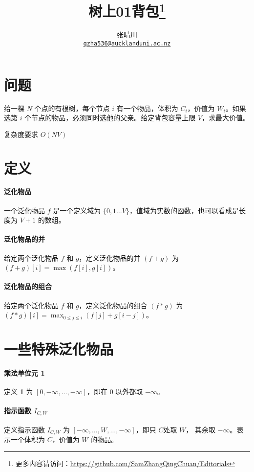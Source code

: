\documentclass{article}
\title{树上01背包\footnote{更多内容请访问：\url{https://github.com/SamZhangQingChuan/Editorials}}}
\author{张晴川\\\href{mailto:qzha536@aucklanduni.ac.nz}{\texttt{qzha536@aucklanduni.ac.nz}}}
\begin{document}
\maketitle

\section{问题}
给一棵 $N$ 个点的有根树，每个节点 $i$ 有一个物品，体积为 $C_i$，价值为 $W_i$。如果选第 $i$ 个节点的物品，必须同时选他的父亲。给定背包容量上限 $V$，求最大价值。

复杂度要求 $O(NV)$

\section{定义}

\paragraph{泛化物品}
一个泛化物品 $f$ 是一个定义域为 $\{0,1\ldots V\}$，值域为实数的函数，也可以看成是长度为 $V+1$ 的数组。

\paragraph{泛化物品的并}
给定两个泛化物品 $f$ 和 $g$，定义泛化物品的并 $(f+g)$ 为 $(f+g)[i] = \max(f[i],g[i])$。

\paragraph{泛化物品的组合}
给定两个泛化物品 $f$ 和 $g$，定义泛化物品的组合 $(f*g)$ 为 $(f*g)[i] = \max_{0\le j \le i}(f[j]+g[i-j])$。

\section{一些特殊泛化物品}


\paragraph{乘法单位元 \textbf{1}}
定义 \textbf{1} 为 $[0,-\infty,\ldots,-\infty ]$，即在 $0$ 以外都取 $-\infty$。


\paragraph{指示函数 $I_{C,W}$}
定义指示函数 $I_{C,W}$ 为 $[-\infty,\ldots,W ,\ldots,-\infty ]$，即只 $C$处取 $W$， 其余取 $-\infty$。表示一个体积为 $C$，价值为 $W$ 的物品。
\end{document}
